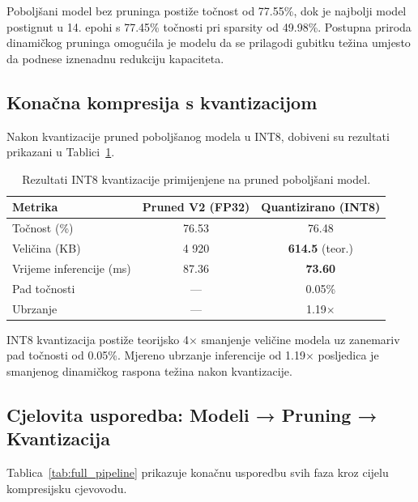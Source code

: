 \documentclass[letterpaper, 10 pt, conference]{ieeeconf}
\begin{document}
Poboljšani model bez pruninga postiže točnost od 77.55\%, dok je najbolji model postignut u 14. epohi s 77.45\% točnosti pri sparsity od 49.98\%.
Postupna priroda dinamičkog pruninga omogućila je modelu da se prilagodi gubitku težina umjesto da podnese iznenadnu redukciju kapaciteta.

\subsection{Konačna kompresija s kvantizacijom}

Nakon kvantizacije pruned poboljšanog modela u INT8, dobiveni su rezultati prikazani u Tablici~\ref{tab:quant}.

\begin{table}[h]
\caption{Rezultati INT8 kvantizacije primijenjene na pruned poboljšani model.}
\label{tab:quant}
\begin{center}
\begin{tabular}{lcc}
\toprule
\textbf{Metrika} & \textbf{Pruned V2 (FP32)} & \textbf{Quantizirano (INT8)} \\
\midrule
Točnost (\%)         & 76.53 & 76.48 \\
Veličina (KB)         & 4 920 & \textbf{614.5} (teor.) \\
Vrijeme inferencije (ms) & 87.36 & \textbf{73.60} \\
\midrule
Pad točnosti          & --- & 0.05\% \\
Ubrzanje              & --- & 1.19$\times$ \\
\bottomrule
\end{tabular}
\end{center}
\end{table}

INT8 kvantizacija postiže teorijsko 4$\times$ smanjenje veličine modela uz zanemariv pad točnosti od 0.05\%.
Mjereno ubrzanje inferencije od 1.19$\times$ posljedica je smanjenog dinamičkog raspona težina nakon kvantizacije.

\subsection{Cjelovita usporedba: Modeli → Pruning → Kvantizacija}

Tablica~\ref{tab:full_pipeline} prikazuje konačnu usporedbu svih faza kroz cijelu kompresijsku cjevovodu.
\end{document}
